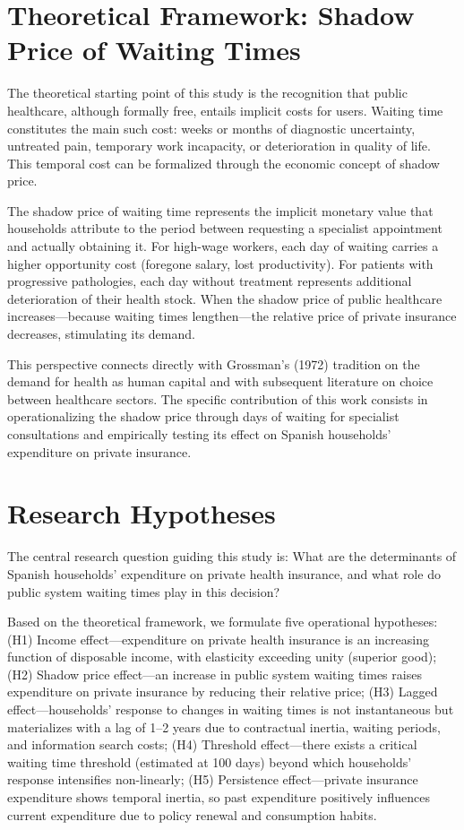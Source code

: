 \documentclass[12pt, a4paper, twoside]{report}
\begin{document}
\section*{Theoretical Framework: Shadow Price of Waiting Times}

The theoretical starting point of this study is the recognition that public healthcare, although formally free, entails implicit costs for users. Waiting time constitutes the main such cost: weeks or months of diagnostic uncertainty, untreated pain, temporary work incapacity, or deterioration in quality of life. This temporal cost can be formalized through the economic concept of shadow price.

The shadow price of waiting time represents the implicit monetary value that households attribute to the period between requesting a specialist appointment and actually obtaining it. For high-wage workers, each day of waiting carries a higher opportunity cost (foregone salary, lost productivity). For patients with progressive pathologies, each day without treatment represents additional deterioration of their health stock. When the shadow price of public healthcare increases---because waiting times lengthen---the relative price of private insurance decreases, stimulating its demand.

This perspective connects directly with Grossman's (1972) tradition on the demand for health as human capital and with subsequent literature on choice between healthcare sectors. The specific contribution of this work consists in operationalizing the shadow price through days of waiting for specialist consultations and empirically testing its effect on Spanish households' expenditure on private insurance.

\section*{Research Hypotheses}

The central research question guiding this study is: What are the determinants of Spanish households' expenditure on private health insurance, and what role do public system waiting times play in this decision?

Based on the theoretical framework, we formulate five operational hypotheses: (H1) Income effect---expenditure on private health insurance is an increasing function of disposable income, with elasticity exceeding unity (superior good); (H2) Shadow price effect---an increase in public system waiting times raises expenditure on private insurance by reducing their relative price; (H3) Lagged effect---households' response to changes in waiting times is not instantaneous but materializes with a lag of 1--2 years due to contractual inertia, waiting periods, and information search costs; (H4) Threshold effect---there exists a critical waiting time threshold (estimated at 100 days) beyond which households' response intensifies non-linearly; (H5) Persistence effect---private insurance expenditure shows temporal inertia, so past expenditure positively influences current expenditure due to policy renewal and consumption habits.
\end{document}
